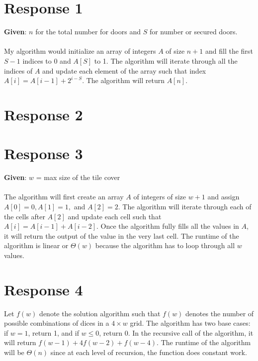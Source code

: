 \documentclass[12pt, a4paper]{article}
\begin{document}
\maketitle
\section*{\centering Response 1}
\textbf{Given}: \(n\) for the total number for doors and \(S\) for number or secured doors.
\\
\\
My algorithm would initialize an array of integers \(A\) of size \(n + 1\) and fill the first \(S-1\) indices to 0 and \(A[S]\) to 1. 
The algorithm will iterate through all the indices of \(A\) and update each element of the array such that index \(A[i] = A[i - 1] + 2^{i - S}\).
The algorithm will return \(A[n]\).

\newpage
\section*{\centering Response 2}


\newpage
\section*{\centering Response 3}

\textbf{Given}: \(w\) = max size of the tile cover
\\
\\
The algorithm will first create an array \(A\) of integers of size \(w + 1\) and assign \(A[0] = 0, A[1] = 1,\) and \(A[2] = 2\).
The algorithm will iterate through each of the cells after \(A[2]\) and update each cell such that \(A[i] = A[i - 1] + A[i - 2]\).
Once the algorithm fully fills all the values in \(A\), it will return the output of the value in the very last cell.
The runtime of the algorithm is linear or \(\Theta(w)\) because the algorithm has to loop through all \(w\) values.   

\newpage
\section*{\centering Response 4}
Let \(f(w)\) denote the solution algorithm such that \(f(w)\) denotes the number of possible combinations of dices in a \(4 \times w\) grid.
The algorithm has two base cases: if \(w = 1\), return 1, and if \(w \leq 0\), return 0.
In the recursive call of the algorithm, it will return \(f(w - 1) + 4f(w - 2) + f(w - 4)\). 
The runtime of the algorithm will be \(\Theta(n)\) since at each level of recursion, the function does constant work.
\end{document}
